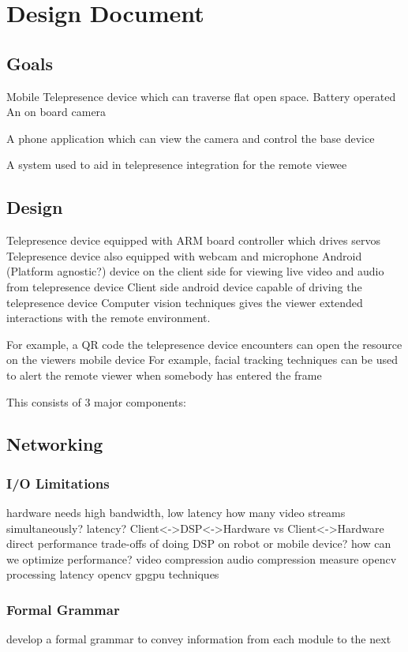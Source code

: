 \documentclass[a4paper,12pt]{report}
\begin{document}
\chapter{Design Document}

\section{Goals}
Mobile Telepresence device which can traverse flat open space.
Battery operated
An on board camera

A phone application which can view the camera and control the base device

A system used to aid in telepresence integration for the remote viewee

\section{Design}
Telepresence device equipped with ARM board controller which drives servos
Telepresence device also equipped with webcam and microphone
Android (Platform agnostic?) device on the client side for viewing live video and audio from telepresence device
Client side android device capable of driving the telepresence device
Computer vision techniques gives the viewer extended interactions with the remote environment. 

For example, a QR code the telepresence device encounters can open the resource on the viewers mobile device
For example, facial tracking techniques can be used to alert the remote viewer when somebody has entered the frame

This consists of 3 major components:

\section{Networking}
	\subsection{I/O Limitations}
		hardware needs high bandwidth, low latency
		how many video streams simultaneously?
		latency? Client\textless -\textgreater DSP\textless -\textgreater Hardware vs Client\textless -\textgreater Hardware direct
		performance trade-offs of doing DSP on robot or mobile device?
		how can we optimize performance?
			video compression
			audio compression
			measure opencv processing latency
			opencv gpgpu techniques
	\subsection{Formal Grammar}
		develop a formal grammar to convey information from each module to the next
\end{document}
